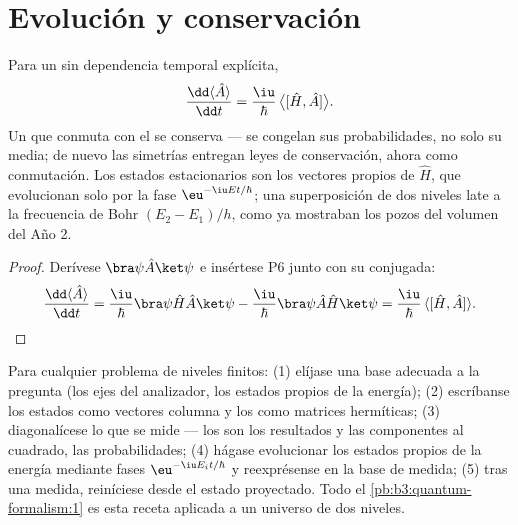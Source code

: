 \section{Evolución y conservación}

\begin{proposition}\label{prop:b3:quantum-formalism:evolution}
Para un  sin dependencia temporal explícita,
\[
\frac{\dd\langle\hat A\rangle}{\dd t}
 = \frac{\iu}{\hbar}\,\big\langle[\hat H, \hat A]\big\rangle .
\]
Un  que conmuta con el  se conserva --- se congelan
sus probabilidades, no solo su media; de nuevo las simetrías entregan leyes
de conservación, ahora como conmutación. Los estados estacionarios son los
vectores propios de $\hat H$, que evolucionan solo por la fase
$\eu^{-\iu Et/\hbar}$; una superposición de dos niveles late a la frecuencia
de Bohr $(E_2 - E_1)/h$, como ya mostraban los pozos del volumen del Año 2.
\end{proposition}

\begin{proof}
Derívese $\bra\psi\hat A\ket\psi$ e insértese P6 junto con su
conjugada:
\[
\frac{\dd\langle\hat A\rangle}{\dd t}
 = \frac{\iu}{\hbar}\bra\psi\hat H\hat A\ket\psi
 - \frac{\iu}{\hbar}\bra\psi\hat A\hat H\ket\psi
 = \frac{\iu}{\hbar}\,\langle[\hat H, \hat A]\rangle .
\qedhere
\]
\end{proof}

\begin{method}\label{met:b3:quantum-formalism:method}
Para cualquier problema de niveles finitos: (1) elíjase una base adecuada a
la pregunta (los ejes del analizador, los estados propios de la energía);
(2) escríbanse los estados como vectores columna y los  como
matrices hermíticas; (3) diagonalícese lo que se mide --- los  son los resultados y las componentes al cuadrado, las
probabilidades; (4) hágase evolucionar los estados propios de la energía
mediante fases $\eu^{-\iu E_it/\hbar}$ y reexprésense en la base de medida;
(5) tras una medida, reiníciese desde el estado proyectado. Todo el
\cref{pb:b3:quantum-formalism:1} es esta receta aplicada a un universo de
dos niveles.
\end{method}


